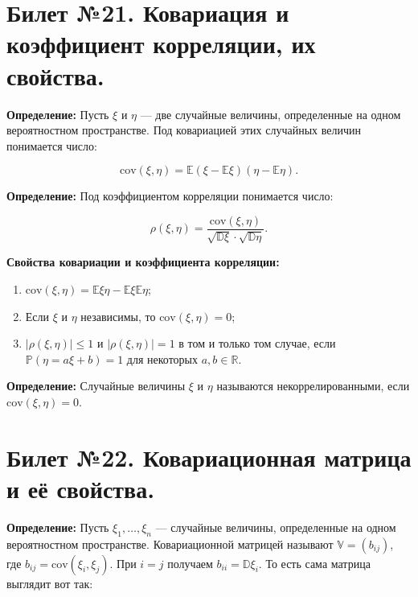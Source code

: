 \section{Билет №21. Ковариация и коэффициент корреляции, их свойства.}
\hspace{\parindent}\textbf{Определение:} Пусть $\xi$ и $\eta$ — две случайные величины, определенные на одном вероятностном пространстве. Под ковариацией этих случайных величин понимается число:

\begin{equation*}
	\text{cov}(\xi , \eta) = \mathbb{E}(\xi - \mathbb{E}\xi)(\eta - \mathbb{E}\eta).
\end{equation*} 

\textbf{Определение:} Под коэффициентом корреляции понимается число:

\begin{equation*}
	\rho(\xi , \eta) = \frac{\text{cov}(\xi , \eta)}{\sqrt{\mathbb{D}\xi}\cdot\sqrt{\mathbb{D}\eta}}.
\end{equation*}

\textbf{Свойства ковариации и коэффициента корреляции:}

\begin{enumerate}
    \item $\text{cov}(\xi , \eta) = \mathbb{E}\xi\eta - \mathbb{E}\xi\mathbb{E}\eta$;
    \item Если $\xi$ и $\eta$ независимы, то $\text{cov}(\xi , \eta) = 0$;
    \item $|\rho(\xi , \eta)| \leqslant 1$ и $|\rho(\xi , \eta)| = 1 $ в том и только том случае, если \\$\mathbb{P}(\eta = a\xi + b) = 1$ для некоторых $a, b \in \mathbb{R}$.
\end{enumerate}

\textbf{Определение:} Случайные величины $\xi$ и $\eta$ называются некоррелированными, если $\text{cov}(\xi , \eta) = 0$.

\section{Билет №22. Ковариационная матрица и её свойства.}
\hspace{\parindent}\textbf{Определение:} Пусть $\xi_{1},\dots,\xi_{n}$ — случайные величины, определенные на одном вероятностном пространстве. Ковариационной матрицей называют $\mathbb{V} = (b_{ij})$, где $b_{ij} = \text{cov}(\xi_{i} , \xi_{j})$. При $i = j$ получаем $b_{ii} = \mathbb{D}\xi_{i}$. То есть сама матрица выглядит вот так:


